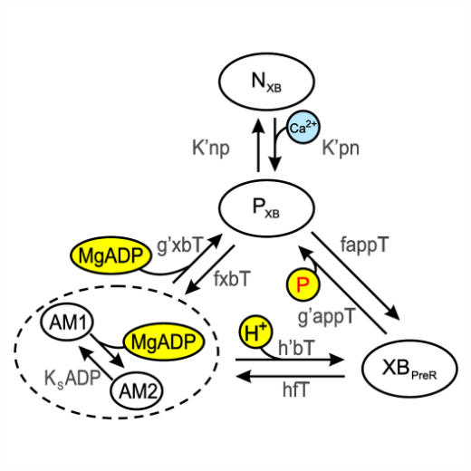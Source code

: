 \documentclass[a0,portrait]{a0poster}
\begin{document}
\begin{multicols}{2}
\begin{center}%
\includegraphics[scale=0.7]{cross-bridge_scheme_v2}
\end{center}%




%


\end{multicols}
\end{document}
